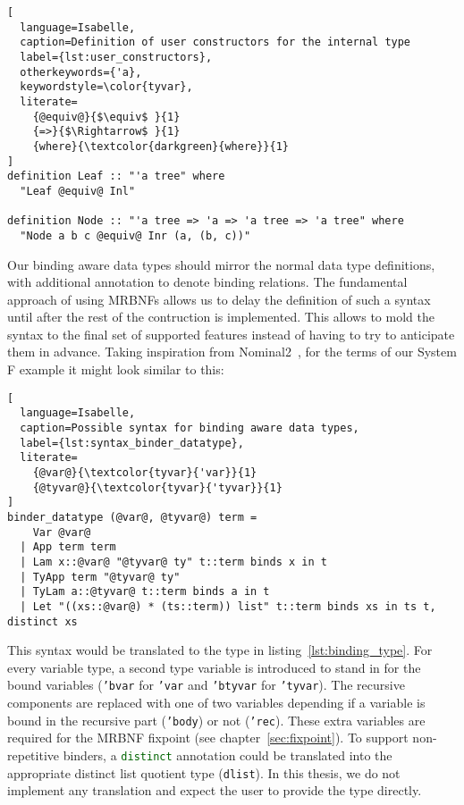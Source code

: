 \begin{minipage}{\textwidth}
\begin{lstlisting}[
  language=Isabelle,
  caption=Definition of user constructors for the internal type
  label={lst:user_constructors},
  otherkeywords={'a},
  keywordstyle=\color{tyvar},
  literate=
    {@equiv@}{$\equiv$ }{1}
    {=>}{$\Rightarrow$ }{1}
    {where}{\textcolor{darkgreen}{where}}{1}
]
definition Leaf :: "'a tree" where
  "Leaf @equiv@ Inl"

definition Node :: "'a tree => 'a => 'a tree => 'a tree" where
  "Node a b c @equiv@ Inr (a, (b, c))"
\end{lstlisting}
\end{minipage}

Our binding aware data types should mirror the normal data type definitions, with additional annotation to denote binding relations. The fundamental approach of using \acp{MRBNF} allows us to delay the definition of such a syntax until after the rest of the contruction is implemented. This allows to mold the syntax to the final set of supported features instead of having to try to anticipate them in advance. Taking inspiration from Nominal2~\cite{nominal2}, for the terms of our System F example it might look similar to this:

\begin{lstlisting}[
  language=Isabelle,
  caption=Possible syntax for binding aware data types,
  label={lst:syntax_binder_datatype},
  literate=
    {@var@}{\textcolor{tyvar}{'var}}{1}
    {@tyvar@}{\textcolor{tyvar}{'tyvar}}{1}
]
binder_datatype (@var@, @tyvar@) term =
    Var @var@
  | App term term
  | Lam x::@var@ "@tyvar@ ty" t::term binds x in t
  | TyApp term "@tyvar@ ty"
  | TyLam a::@tyvar@ t::term binds a in t
  | Let "((xs::@var@) * (ts::term)) list" t::term binds xs in ts t, distinct xs
\end{lstlisting}

This syntax would be translated to the type in listing~\ref{lst:binding_type}. For every variable type, a second type variable is introduced to stand in for the bound variables (\texttt{\textcolor{tyvar}{'bvar}} for \texttt{\textcolor{tyvar}{'var}} and \texttt{\textcolor{tyvar}{'btyvar}} for \texttt{\textcolor{tyvar}{'tyvar}}). The recursive components are replaced with one of two variables depending if a variable is bound in the recursive part (\texttt{\textcolor{tyvar}{'body}}) or not (\texttt{\textcolor{tyvar}{'rec}}). These extra variables are required for the \ac{MRBNF} fixpoint (see chapter~\ref{sec:fixpoint}). To support non-repetitive binders, a \texttt{\textcolor{darkgreen}{distinct}} annotation could be translated into the appropriate distinct list quotient type (\texttt{dlist}). In this thesis, we do not implement any translation and expect the user to provide the type directly.

